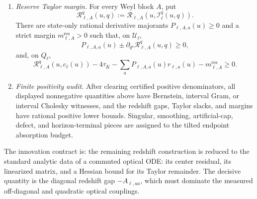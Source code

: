 \begin{definition}
\begin{enumerate}
    \item \emph{Reserve Taylor margin.}  For every Weyl block $A$, put
    \[
        \mathcal R_{\ell,A}^q(u,q)
        :=
        \mathcal R_{\ell,A}(u,\mathcal I_\ell^q(u,q)).
    \]
    There are state-only rational derivative majorants
    $P_{\ell,A,a}(u)\ge0$ and a strict margin
    $m_{\ell,A}^{\mathrm{res}}>0$ such that, on $\mathcal U_\ell$,
    \[
        P_{\ell,A,a}(u)
        \pm
        \partial_{q^a}\mathcal R_{\ell,A}^q(u,q)\ge0,
    \]
    and, on $Q_\ell$,
    \[
        \mathcal R_{\ell,A}^q(u,c_\ell(u))-4\tau_K
        -\sum_aP_{\ell,A,a}(u)r_{\ell,a}(u)
        -m_{\ell,A}^{\mathrm{res}}\ge0 .
    \]

    \item \emph{Finite positivity audit.}  After clearing certified positive
    denominators, all displayed nonnegative quantities above have Bernstein,
    interval Gram, or interval Cholesky witnesses, and the redshift gaps,
    Taylor slacks, and margins have rational positive lower bounds.  Singular,
    smoothing, artificial-cap, defect, and horizon-terminal pieces are assigned
    to the tilted endpoint absorption budget.
\end{enumerate}
The innovation contract is: the remaining redshift construction is reduced to
the standard analytic data of a commuted optical ODE: its center residual, its
linearized matrix, and a Hessian bound for its Taylor remainder.  The decisive
quantity is the diagonal redshift gap
$-A_{\ell,aa}$, which must dominate the measured off-diagonal and quadratic
optical couplings.
\end{definition}

